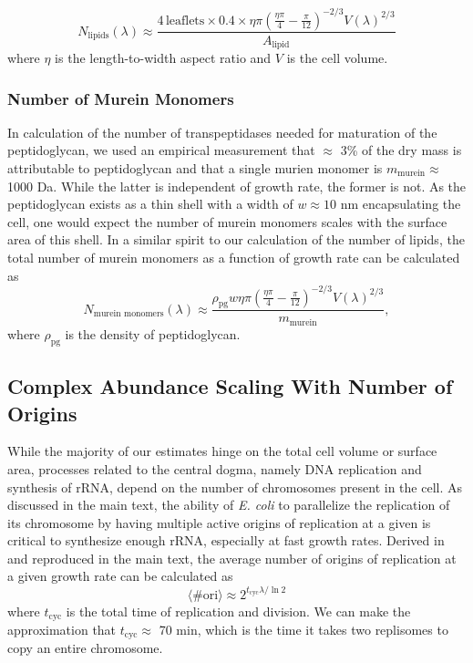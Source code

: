 \begin{equation}
    N_\text{lipids}(\lambda) \approx \frac{4\,\text{leaflets} \times 0.4 \times
    \eta\pi\left(\frac{\eta\pi}{4} -
    \frac{\pi}{12}\right)^{-2/3}V(\lambda)^{2/3}}{A_\text{lipid}}
\end{equation}
where $\eta$ is the length-to-width aspect ratio and $V$ is the cell volume.

\subsubsection{Number of Murein Monomers}
In calculation of the number of transpeptidases needed for maturation of the
peptidoglycan, we used an empirical measurement that $\approx$ 3\% of the dry
mass is attributable to peptidoglycan and that a single murien monomer is
$m_\text{murein} \approx$ 1000 Da. While the latter is independent of growth rate, the former is
not. As the peptidoglycan exists as a thin shell with a width of $w \approx 10$
nm encapsulating the cell, one would expect the number of murein monomers scales
with the surface area of this shell. In a similar spirit to our calculation of
the number of lipids, the total number of murein monomers as a function of
growth rate can be calculated as
\begin{equation}
N_\text{murein monomers}(\lambda) \approx \frac{\rho_\text{pg} w \eta\pi\left(\frac{\eta\pi}{4} -
    \frac{\pi}{12}\right)^{-2/3}V(\lambda)^{2/3}}{m_\text{murein}},
\end{equation}
where $\rho_\text{pg}$ is the density of peptidoglycan.


\subsection{Complex Abundance Scaling With Number of Origins}
While the majority of our estimates hinge on the total cell volume or surface
area, processes related to the central dogma, namely DNA replication and
synthesis of rRNA, depend on the number of chromosomes present in the cell. As
discussed in the main text, the ability of \textit{E. coli} to parallelize the
replication of its chromosome by having multiple active origins of replication
at a given is critical to synthesize enough rRNA, especially at fast growth
rates. Derived in \cite{si2017} and reproduced in the main text, the average number of
origins of replication at a given growth rate can be calculated as
\begin{equation}
\langle\# \text{ori} \rangle \approx 2^{t_\text{cyc} \lambda / \ln 2}
\label{eq:nori}
\end{equation}
where $t_\text{cyc}$ is the total time of replication and division. We can make
the approximation that $t_\text{cyc} \approx$ 70 min, which is the  time it
takes two replisomes to copy an entire chromosome.

